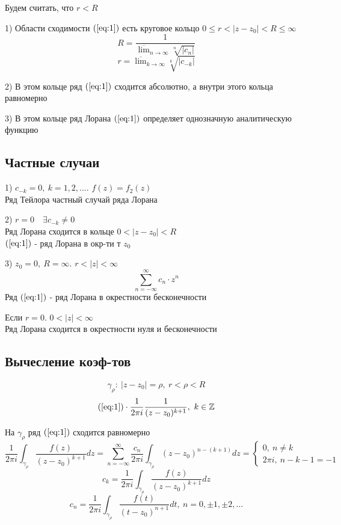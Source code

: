 \documentclass[a4paper]{article}
\begin{document}
Будем считать, что $ r < R $ 

\begin{tcolorbox}
1) Области сходимости $ (\ref{eq:1}) $ есть круговое кольцо $ 0 \leq r < |z - z_0| < R
\leq \infty$  
\[
    R = \frac{1}{\overline{\lim}_{n \to \infty} \sqrt[n]{|c_n|}  }
\]
\[
    r = \overline{\lim}_{k \to \infty} \sqrt[k]{|c_{-k}|}
\]

2) В этом кольце ряд $ (\ref{eq:1}) $ сходится абсолютно, а внутри этого кольца
равномерно

3) В этом кольце ряд Лорана $ (\ref{eq:1}) $ определяет однозначную аналитическую
функцию
\end{tcolorbox}

\subsection*{\centering Частные случаи}

\begin{tcolorbox}
1) $ c_{-k} = 0, \ k = 1, 2, \dots $. $ f(z) = f_2(z) $\\
Ряд Тейлора частный случай ряда Лорана

2) $ r = 0 \quad \exists c_{-k} \neq 0 $\\
Ряд Лорана сходится в кольце $ 0 < |z-z_0| < R $ \\
$ (\ref{eq:1}) $ - ряд Лорана в окр-ти т $ z_0 $ 

3) $ z_0 = 0, \ R = \infty $. $ r < |z| < \infty $  
\[
    \sum_{n=-\infty}^{\infty} c_n \cdot z^{n}
\]
Ряд $ (\ref{eq:1}) $ - ряд Лорана в окрестности бесконечности

Если $ r = 0 $. $ 0 < |z| < \infty $\\
Ряд Лорана сходится в окрестности нуля и бесконечности
\end{tcolorbox}

\subsection*{\centering Вычесление коэф-тов}

\[
    \gamma_{\rho}: \ |z - z_0| = \rho, \ r < \rho < R
\]
\[
    (\ref{eq:1}) \cdot \frac{1}{2 \pi i} \frac{1}{(z - z_0)^{k+1}}, \ k \in \mathbb{Z}
\]

На $ \gamma_\rho $ ряд $ (\ref{eq:1}) $ сходится равномерно
\[
    \frac{1}{2 \pi i} \int_{\gamma_\rho} \frac{f(z)}{(z - z_0)^{k+1}} dz =
    \sum_{n=-\infty}^{\infty} \frac{c_n}{2 \pi i} \int_{\gamma_\rho}
    (z - z_0)^{n-(k+1)} dz = \begin{cases}
        0, \ n \neq k\\
        2 \pi i, \ n - k - 1 = -1
    \end{cases}
\]
\[
    c_k = \frac{1}{2 \pi i} \int_{\gamma_\rho} \frac{f(z)}{(z - z_0)^{k+1}} dz
\]
\[
    c_n = \frac{1}{2 \pi i} \int_{\gamma_\rho} \frac{f(t)}{(t - z_0)^{n+1}} dt, \
    n = 0, \pm 1, \pm 2, \dots
\]
\end{document}
